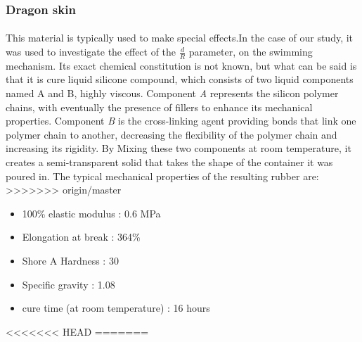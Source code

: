 \subsubsection{Dragon skin} 
\paragraph{}
This material is typically used to make special effects.In the case of our study, it was used to investigate the effect of the $\frac{d}{R}$ parameter, on the swimming mechanism. Its exact chemical constitution is not known, but what can be said is that it is cure liquid silicone compound, which consists of two liquid components named A and B, highly viscous. Component \emph{A} represents the silicon polymer chains, with eventually the presence of fillers to enhance its mechanical properties. Component \emph{B} is the cross-linking agent providing bonds that link one polymer chain to another, decreasing the flexibility of the polymer chain and increasing its rigidity. By Mixing these two components at room temperature, it creates a semi-transparent solid that takes the shape of the container it was poured in.
The typical mechanical properties of the resulting rubber are:
>>>>>>> origin/master
\begin{itemize}
	\item 100\% elastic modulus : 0.6 MPa
	\item Elongation at break : 364\%
	\item Shore A Hardness : 30 
	\item Specific gravity : 1.08 
	\item cure time (at room temperature) : 16 hours
\end{itemize}

<<<<<<< HEAD
=======
